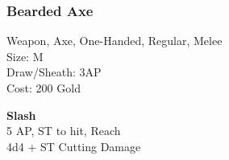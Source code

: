 \subsubsection{Bearded Axe}\label{weapon:beardedAxe}
Weapon, Axe, One-Handed, Regular, Melee\\
Size: M\\
Draw/Sheath: 3AP\\
Cost: 200 Gold

\textbf{Slash}\\
5 AP, ST to hit,  Reach\\
4d4 + \texttimes ST Cutting Damage
